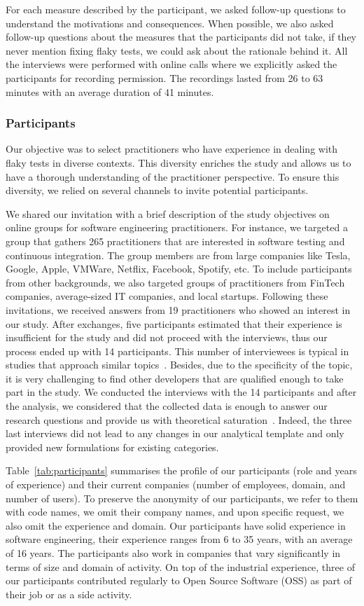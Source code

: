 For each measure described by the participant, we asked follow-up questions to understand the motivations and consequences.
When possible, we also asked follow-up questions about the measures that the participants did not take, \eg if they never mention fixing flaky tests, we could ask about the rationale behind it.
All the interviews were performed with online calls where we explicitly asked the participants for recording permission. 
The recordings lasted from 26 to 63 minutes with an average duration of 41 minutes.
\subsubsection{Participants}
Our objective was to select practitioners who have experience in dealing with flaky tests in diverse contexts.
This diversity enriches the study and allows us to have a thorough understanding of the practitioner perspective.
To ensure this diversity, we relied on several channels to invite potential participants.

We shared our invitation with a brief description of the study objectives on online groups for software engineering practitioners.
For instance, we targeted a group that gathers 265 practitioners that are interested in software testing and continuous integration.
The group members are from large companies like Tesla, Google, Apple, VMWare, Netflix, Facebook, Spotify, etc.
To include participants from other backgrounds, we also targeted groups of practitioners from FinTech companies, average-sized IT companies, and local startups.
Following these invitations, we received answers from 19 practitioners who showed an interest in our study.
After exchanges, five participants estimated that their experience is insufficient for the study and did not proceed with the interviews, thus our process ended up with 14 participants.
This number of interviewees is typical in studies that approach similar topics~\cite{tomasdottir2017and,8999994}.
Besides, due to the specificity of the topic, it is very challenging to find other developers that are qualified enough to take part in the study.
We conducted the interviews with the 14 participants and after the analysis, we considered that the collected data is enough to answer our research questions and provide us with theoretical saturation~\cite{glaser2007remodeling}.
Indeed, the three last interviews did not lead to any changes in our analytical template and only provided new formulations for existing categories.

Table~\ref{tab:participants} summarises the profile of our participants (role and years of experience) and their current companies (number of employees, domain, and number of users).
To preserve the anonymity of our participants, we refer to them with code names, we omit their company names, and upon specific request, we also omit the experience and domain.
Our participants have solid experience in software engineering, their experience ranges from 6 to 35 years, with an average of 16 years.
The participants also work in companies that vary significantly in terms of size and domain of activity.
On top of the industrial experience, three of our participants contributed regularly to Open Source Software (OSS) as part of their job or as a side activity.

